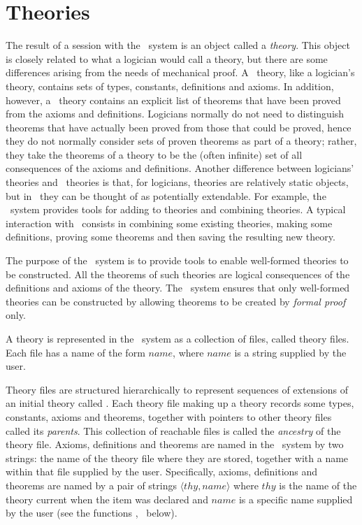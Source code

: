 \section{Theories}
\label{theories}

The result of a session with the \HOL\ system is an object called a {\it
theory\/}.  This object is closely related to what a logician would call a
theory, but there are some differences arising from the needs of mechanical
proof.  A \HOL\ theory, like a logician's theory, contains sets of types,
constants, definitions and axioms.  In addition, however, a \HOL\ theory
contains an explicit list of theorems that have been proved from the axioms
and definitions. Logicians normally do not need to distinguish theorems that
have actually been proved from those that could be proved, hence they do not
normally consider sets of proven theorems as part of a theory; rather, they
take the theorems of a theory to be the (often infinite) set of all
consequences of the axioms and definitions.  Another difference between
logicians' theories and \HOL\ theories is that, for logicians, theories are
relatively static objects, but in \HOL\ they can be thought of as potentially
extendable. For example, the \HOL\ system provides tools for adding to
theories and combining theories.  A typical interaction with \HOL\ consists in
combining some existing theories, making some definitions, proving some
theorems and then saving the resulting new theory.

The purpose of the \HOL\ system is to provide tools to enable well-formed
theories to be constructed.  All the theorems of such theories are logical
consequences of the definitions and axioms of the theory.  The \HOL\ system
ensures that only well-formed theories can be constructed by allowing
theorems to be created by {\it formal proof\/} only.

A theory is represented in the \HOL\  system as  a collection  of files, called
theory files.  Each file has a name of the form $name$, where $name$ is
a string supplied by the user.

Theory files are structured hierarchically to represent sequences of extensions of
an initial theory called .
Each theory file making up a theory records
some types, constants, axioms and
theorems, together with
pointers to other theory files called its {\it parents\/}.
This collection of reachable files is called the {\it
ancestry\/} of the theory file. Axioms, definitions
and theorems are named in the \HOL\ system by two strings: the name of the theory
file where they are stored, together with a name within that file supplied by the
user.
Specifically,
axioms, definitions and theorems
are named by a pair of strings $\langle thy,name\rangle$
where $thy$ is the name of the
theory current when the item was declared and $name$
is a specific name supplied by the user (see the functions
,  \etc\ below).

